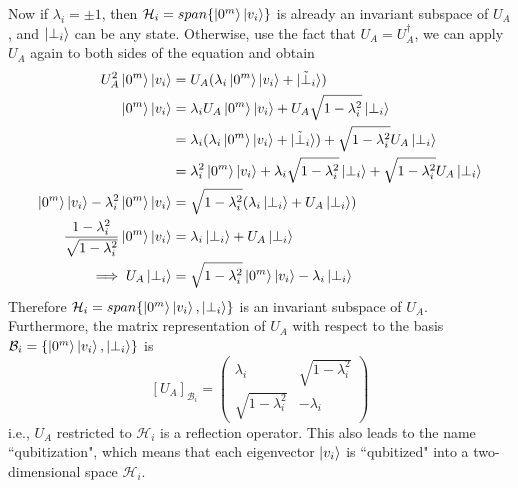 \documentclass[12pt, oneside]{book}
\theoremstyle{definition}
\theoremstyle{definition}
\theoremstyle{remark}
\begin{document}
Now if $\lambda_i =\pm 1$, then $\mathcal{H}_i=span\{\ket{0^m}\ket{v_i}\}$ is already an invariant subspace of $U_A$, and $\ket{\perp_i}$ can be any state. Otherwise, use the fact that $U_A=U_A^{\dagger}$, we can apply $U_A$ again to both sides of the equation and obtain
\begin{align*}
U_A^2 \ket{0^m} \ket{v_i} &=U_A(\lambda_i \ket{0^m}\ket{v_i} +\ket{\tilde{\perp}_i})\\
\ket{0^m}\ket{v_i}&=\lambda_i U_A \ket{0^m}\ket{v_i} + U_A \sqrt{1-\lambda_i^2}\ket{\perp_i}\\
&=\lambda_i (\lambda_i \ket{0^m}\ket{v_i} + \ket{\tilde{\perp}_i}) + \sqrt{1-\lambda_i^2} U_A\ket{\perp_i}\\
&=\lambda_i^2 \ket{0^m}\ket{v_i} + \lambda_i \sqrt{1-\lambda_i^2} \ket{\perp_i} +\sqrt{1-\lambda_i^2} U_A\ket{\perp_i}\\
\ket{0^m}\ket{v_i} - \lambda_i^2 \ket{0^m}\ket{v_i} &= \sqrt{1-\lambda_i^2}(\lambda_i \ket{\perp_i} + U_A \ket{\perp_i})\\
\frac{1-\lambda_i^2}{\sqrt{1-\lambda_i^2}} \ket{0^m}\ket{v_i} &= \lambda_i \ket{\perp_i} + U_A \ket{\perp_i} \\
\implies U_A \ket{\perp_i} & = \sqrt{1-\lambda_i^2} \ket{0^m}\ket{v_i} - \lambda_i \ket{\perp_i}
\end{align*}
Therefore $\mathcal{H}_i = span\{\ket{0^m}\ket{v_i},\ket{\perp_i}\}$ is an invariant subspace of $U_A$. Furthermore, the matrix representation of $U_A$ with respect to the basis $\mathcal{B}_i = \{\ket{0^m}\ket{v_i}, \ket{\perp_i}\}$ is
\[
[U_A]_{\mathcal{B}_i} = \begin{pmatrix} \lambda_i & \sqrt{1-\lambda_i^2} \\ 
\sqrt{1-\lambda_i^2} & -\lambda_i \end{pmatrix}
\]
i.e., $U_A$ restricted to $\mathcal{H}_i$ is a reflection operator. This also leads to the name ``qubitization", which means that each eigenvector $\ket{v_i}$ is ``qubitized" into a two-dimensional space $\mathcal{H}_i$.
\end{document}
